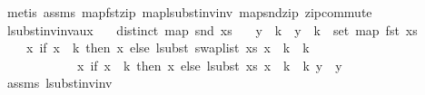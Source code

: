 \begin{isabellebody}
%
\isadelimproof
%
\endisadelimproof
%
\isatagproof
{}\isamarkupfalse%
\ {\isacharparenleft}{\kern0pt}metis\ assms{\isacharparenleft}{\kern0pt}{}{\isacharcomma}{\kern0pt}{}{\isacharcomma}{\kern0pt}{}{\isacharparenright}{\kern0pt}\ map{\isacharunderscore}{\kern0pt}fst{\isacharunderscore}{\kern0pt}zip\ map{\isacharunderscore}{\kern0pt}lsubst{\isacharunderscore}{\kern0pt}inv{\isacharunderscore}{\kern0pt}inv\ map{\isacharunderscore}{\kern0pt}snd{\isacharunderscore}{\kern0pt}zip\ zip{\isacharunderscore}{\kern0pt}commute{\isacharparenright}{\kern0pt}%
\endisatagproof
{\isafoldproof}%
%
\isadelimproof
\isanewline
%
\endisadelimproof
\isanewline
\isanewline
{}\isamarkupfalse%
\ lsubst{\isacharunderscore}{\kern0pt}inv{\isacharunderscore}{\kern0pt}inv{\isacharunderscore}{\kern0pt}aux{}{\isacharcolon}{\kern0pt}\isanewline
\ \ \ {\isachardoublequoteopen}distinct\ {\isacharparenleft}{\kern0pt}map\ snd\ xs{\isacharparenright}{\kern0pt}{\isachardoublequoteclose}\isanewline
\ \ \ {\isachardoublequoteopen}y\ {\isachargreater}{\kern0pt}{\isacharequal}{\kern0pt}\ k\ {\isacharminus}{\kern0pt}{\isacharminus}{\kern0pt}{\isachargreater}{\kern0pt}\ y\ {\isacharminus}{\kern0pt}\ k\ {\isasymin}\ set\ {\isacharparenleft}{\kern0pt}map\ fst\ xs{\isacharparenright}{\kern0pt}{\isachardoublequoteclose}\isanewline
\ \ \ \ {\isachardoublequoteopen}{\isacharparenleft}{\kern0pt}{\isasymlambda}x{\isachardot}{\kern0pt}\ if\ x\ {\isacharless}{\kern0pt}\ k\ then\ x\ else\ {\isacharparenleft}{\kern0pt}lsubst\ {\isacharparenleft}{\kern0pt}swap{\isacharunderscore}{\kern0pt}list\ xs{\isacharparenright}{\kern0pt}\ {\isacharparenleft}{\kern0pt}x\ {\isacharminus}{\kern0pt}\ k{\isacharparenright}{\kern0pt}\ {\isacharplus}{\kern0pt}\ k{\isacharparenright}{\kern0pt}{\isacharparenright}{\kern0pt}\isanewline
\ \ \ \ \ \ \ \ \ \ \ \ {\isacharparenleft}{\kern0pt}{\isacharparenleft}{\kern0pt}{\isasymlambda}x{\isachardot}{\kern0pt}\ if\ x\ {\isacharless}{\kern0pt}\ k\ then\ x\ else\ {\isacharparenleft}{\kern0pt}lsubst\ xs\ {\isacharparenleft}{\kern0pt}x\ {\isacharminus}{\kern0pt}\ k{\isacharparenright}{\kern0pt}\ {\isacharplus}{\kern0pt}\ k{\isacharparenright}{\kern0pt}{\isacharparenright}{\kern0pt}\ y{\isacharparenright}{\kern0pt}\ {\isacharequal}{\kern0pt}\ y{\isachardoublequoteclose}\isanewline
%
\isadelimproof
%
\endisadelimproof
%
\isatagproof
{}\isamarkupfalse%
\ assms{\isacharparenleft}{\kern0pt}{}{\isacharcomma}{\kern0pt}{}{\isacharparenright}{\kern0pt}\ lsubst{\isacharunderscore}{\kern0pt}inv{\isacharunderscore}{\kern0pt}inv{}\ \isamarkupfalse%

\end{isabellebody}
